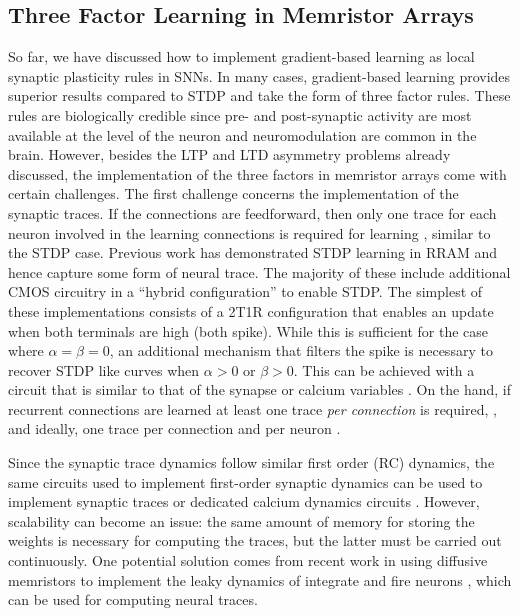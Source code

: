\documentclass[english]{article}
\renewcommand{\cite}{\citep}
\begin{document}
\subsection{Three Factor Learning in Memristor Arrays}\label{sec:3f_rram}
So far, we have discussed how to implement gradient-based learning as local synaptic plasticity rules in \acp{SNN}. 
In many cases, gradient-based learning provides superior results compared to \ac{STDP} and take the form of three factor rules.
These rules are biologically credible since pre- and post-synaptic activity are most available at the level of the neuron and neuromodulation are common in the brain.
However, besides the LTP and LTD asymmetry problems already discussed, the implementation of the three factors in memristor arrays come with certain challenges. 
The first challenge concerns the implementation of the synaptic traces.
If the connections are feedforward, then only one trace for each neuron involved in the learning connections is required for learning \cite{Kaiser_etal18_synaplas}, similar to the \ac{STDP} case.
Previous work has demonstrated \ac{STDP} learning in RRAM and hence capture some form of neural trace.
The majority of these include additional CMOS circuitry in a ``hybrid configuration'' \cite{Ielmini18_braicomp} to enable \ac{STDP}.
The simplest of these implementations consists of a 2T1R configuration that enables an update when both terminals are high (both spike).
While this is sufficient for the case where $\alpha=\beta=0$, an additional mechanism that filters the spike is necessary to recover STDP like curves when $\alpha>0$ or $\beta>0$.
This can be achieved with a circuit that is similar to that of the synapse \cite{Bartolozzi_Indiveri08_silisyna} or calcium variables \cite{Mitra_etal06_vlsispik}.
On the hand, if recurrent connections are learned at least one trace \emph{per connection} is required, \cite{Bellec_etal19_biolinsp}, and ideally, one trace per connection and per neuron \cite{Williams_Zipser89_learalgo}.

Since the synaptic trace dynamics follow similar first order (RC) dynamics, the same circuits used to implement first-order synaptic dynamics can be used to implement synaptic traces \cite{Bartolozzi_Indiveri06_silisyna} or dedicated calcium dynamics circuits \cite{Huayaney_etal16_learsili}.
However, scalability can become an issue: the same amount of memory for storing the weights is necessary for computing the traces, but the latter must be carried out continuously.
One potential solution comes from recent work in using diffusive memristors to implement the leaky dynamics of integrate and fire neurons \cite{Wang_etal18_fullmemr}, which can be used for computing neural traces.
\end{document}
